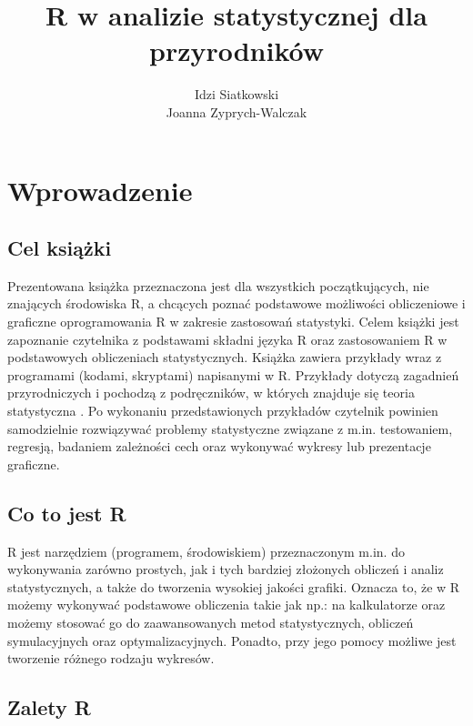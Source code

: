 \documentclass[12pt,B5paper,]{book}
\title{R w analizie statystycznej dla przyrodników}
\author{Idzi Siatkowski \\ Joanna Zyprych-Walczak}
\date{}
\begin{document}
\maketitle

{
\setcounter{tocdepth}{1}
\tableofcontents
}
\chapter{Wprowadzenie}\label{intro}

\section{Cel książki}\label{cel-ksiazki}

Prezentowana książka przeznaczona jest dla wszystkich początkujących,
nie znających środowiska R, a chcących poznać podstawowe możliwości
obliczeniowe i graficzne oprogramowania R w zakresie zastosowań
statystyki. Celem książki jest zapoznanie czytelnika z podstawami
składni języka R oraz zastosowaniem R w podstawowych obliczeniach
statystycznych. Książka zawiera przykłady wraz z programami (kodami,
skryptami) napisanymi w R. Przykłady dotyczą zagadnień przyrodniczych i
pochodzą z podręczników, w których znajduje się teoria statystyczna
\citep{elandt1964, gren1975, kala2005, hanusz2006, dobek2007}. Po
wykonaniu przedstawionych przykładów czytelnik powinien samodzielnie
rozwiązywać problemy statystyczne związane z m.in. testowaniem,
regresją, badaniem zależności cech oraz wykonywać wykresy lub
prezentacje graficzne.

\section{Co to jest R}\label{co-to-jest-r}

R \citep{R} jest narzędziem (programem, środowiskiem) przeznaczonym
m.in. do wykonywania zarówno prostych, jak i tych bardziej złożonych
obliczeń i analiz statystycznych, a także do tworzenia wysokiej jakości
grafiki. Oznacza to, że w R możemy wykonywać podstawowe obliczenia takie
jak np.: na kalkulatorze oraz możemy stosować go do zaawansowanych metod
statystycznych, obliczeń symulacyjnych oraz optymalizacyjnych. Ponadto,
przy jego pomocy możliwe jest tworzenie różnego rodzaju wykresów.

\section{Zalety R}\label{zalety-r}
\end{document}
